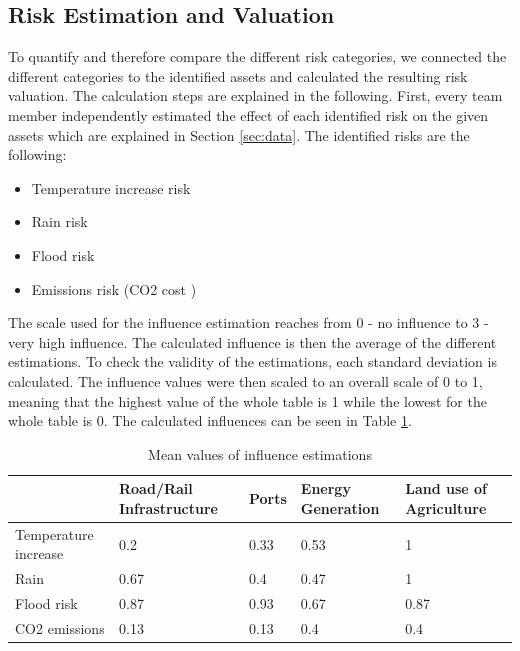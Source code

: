 \documentclass[10pt,a4paper]{article}
\begin{document}
\begin{itemize}
\end{itemize}

\subsection{Risk Estimation and Valuation}

    To quantify and therefore compare the different risk categories, we connected the different categories to the identified assets and calculated the resulting risk valuation. The calculation steps are explained in the following.
    First, every team member independently estimated the effect of each identified risk on the given assets which are explained in Section \ref{sec:data}. The identified risks are the following:
    \begin{itemize}  
        \item Temperature increase risk
        \item Rain risk
        \item Flood risk
        \item Emissions risk (CO2 cost \cite{2022uk})
    \end{itemize}
    The scale used for the influence estimation reaches from 0 - no influence to 3 - very high influence. The calculated influence is then the average of the different estimations. To check the validity of the estimations, each standard deviation is calculated. The influence values were then scaled to an overall scale of 0 to 1, meaning that the highest value of the whole table is 1 while the lowest for the whole table is 0. The calculated influences can be seen in Table \ref{est mean}.
    \begin{table}[H]
    \centering
    \begin{tabular}{|l|l|l|l|l|}
    \hline
                         & Road/Rail Infrastructure & Ports & Energy Generation & Land use of Agriculture \\ \hline
    Temperature increase & 0.2                      & 0.33  & 0.53              & 1                       \\ \hline
    Rain                 & 0.67                     & 0.4   & 0.47              & 1                       \\ \hline
    Flood risk           & 0.87                     & 0.93  & 0.67              & 0.87                    \\ \hline
    CO2 emissions        & 0.13                     & 0.13  & 0.4               & 0.4                    
    \\ \hline
    \end{tabular}
    \caption{Mean values of influence estimations}
    \label{est mean}
    \end{table}
\end{document}
